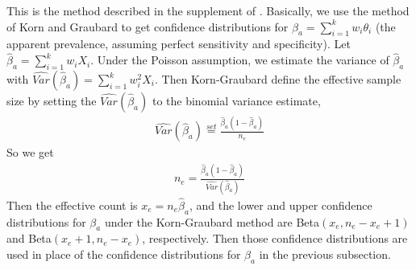 \documentclass{article}
\begin{document}
This is the method described in the supplement of \citet{Kali:2021}.
Basically, we use the method of Korn and Graubard to get confidence distributions for ${\beta}_a = \sum_{i=1}^{k} w_i \theta_i$ (the apparent prevalence, assuming perfect sensitivity and specificity).
Let $\hat{\beta}_a= \sum_{i=1}^{k} w_i X_i$. Under the Poisson assumption, we estimate the variance 
of $\hat{\beta}_a$ with $\widehat{Var}(\hat{\beta}_a) = \sum_{i=1}^{k} w_i^2 X_i$. Then Korn-Graubard define the effective sample size by setting the $\widehat{Var}(\hat{\beta}_a)$ to the binomial variance estimate,
\begin{eqnarray*}
\widehat{Var}(\hat{\beta}_a) \stackrel{set}{=} \frac{\hat{\beta}_a (1-\hat{\beta}_a)}{n_e}
\end{eqnarray*}
So we get 
\begin{eqnarray*}
n_e =   \frac{\hat{\beta}_a (1-\hat{\beta}_a)}{\widehat{Var}(\hat{\beta}_a)}
\end{eqnarray*}
Then the effective count is $x_e = n_e \hat{\beta}_a$, and the lower and upper confidence distributions for ${\beta}_a$ under the Korn-Graubard method are Beta$(x_e, n_e-x_e+1)$ and Beta$(x_e+1,n_e-x_e)$, respectively. 
Then those confidence distributions are used in place of the confidence distributions for $\beta_a$ in the previous subsection. 



%




\end{document}
